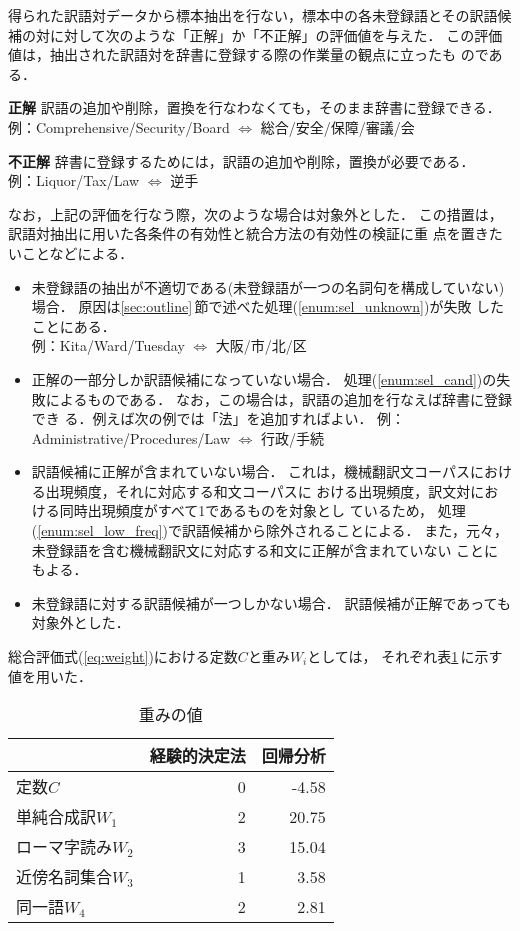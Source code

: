 得られた訳語対データから標本抽出を行ない，標本中の各未登録語とその訳語候
補の対に対して次のような「正解」か「不正解」の評価値を与えた．
この評価値は，抽出された訳語対を辞書に登録する際の作業量の観点に立ったも
のである．
\begin{LIST}
\item[\bf 正解]
訳語の追加や削除，置換を行なわなくても，そのまま辞書に登録できる．\\
例：Comprehensive/Security/Board $\Longleftrightarrow$ 総合/安全/保障/審議/会
\item[\bf 不正解]
辞書に登録するためには，訳語の追加や削除，置換が必要である．\\
例：Liquor/Tax/Law $\Longleftrightarrow$ 逆手
\end{LIST}
なお，上記の評価を行なう際，次のような場合は対象外とした．
この措置は，訳語対抽出に用いた各条件の有効性と統合方法の有効性の検証に重
点を置きたいことなどによる．
\begin{itemize}
\item
未登録語の抽出が不適切である(未登録語が一つの名詞句を構成していない)場合．
原因は\ref{sec:outline}\,節で述べた処理(\ref{enum:sel_unknown})が失敗
したことにある．\\
例：Kita/Ward/Tuesday $\Longleftrightarrow$ 大阪/市/北/区
\item
正解の一部分しか訳語候補になっていない場合．
処理(\ref{enum:sel_cand})の失敗によるものである．
なお，この場合は，訳語の追加を行なえば辞書に登録でき
る．例えば次の例では「法」を追加すればよい．
例：Administrative/Procedures/Law $\Longleftrightarrow$ 行政/手続
\item
訳語候補に正解が含まれていない場合．
これは，機械翻訳文コーパスにおける出現頻度，それに対応する和文コーパスに
おける出現頻度，訳文対における同時出現頻度がすべて1であるものを対象とし
ているため，
処理(\ref{enum:sel_low_freq})で訳語候補から除外されることによる．
また，元々，未登録語を含む機械翻訳文に対応する和文に正解が含まれていない
ことにもよる．
\item
未登録語に対する訳語候補が一つしかない場合．
訳語候補が正解であっても対象外とした．
\end{itemize}

総合評価式(\ref{eq:weight})における定数$C$と重み$W_i$としては，
それぞれ表\ref{tab:weight}\,に示す値を用いた．
\begin{table}[htbp]
\caption{重みの値}
\label{tab:weight}
\begin{center}
\begin{tabular}{|l||r|r|}\hline
& \multicolumn{1}{c|}{経験的決定法} & \multicolumn{1}{c|}{回帰分析} \\\hline\hline
定数$C$           & 0 & -4.58 \\
単純合成訳$W_1$   & 2 & 20.75 \\
ローマ字読み$W_2$ & 3 & 15.04 \\
近傍名詞集合$W_3$ & 1 &  3.58 \\
同一語$W_4$       & 2 &  2.81 \\\hline
\end{tabular}
\end{center}
\end{table}


